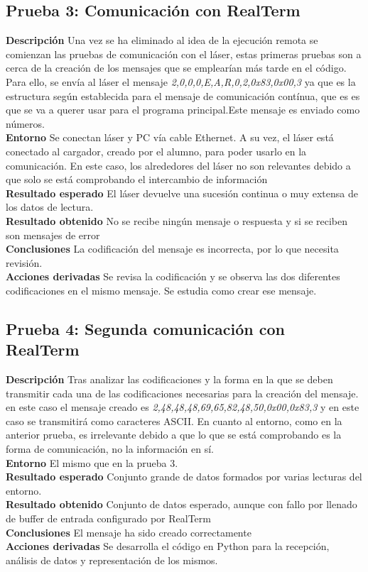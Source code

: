 \subsection{Prueba 3: Comunicación con RealTerm}
\textbf{Descripción} Una vez se ha eliminado al idea de la ejecución remota se comienzan las pruebas de comunicación con el láser, estas primeras pruebas son a cerca de la creación de los mensajes que se emplearían más tarde en el código. Para ello, se envía al láser el mensaje \textit{2,0,0,0,E,A,R,0,2,0x83,0x00,3} ya que es la estructura según establecida para el mensaje de comunicación contínua, que es es que se va a querer usar para el programa principal.Este mensaje es enviado como números.\\
\textbf{Entorno} Se conectan láser y PC vía cable Ethernet. A su vez, el láser está conectado al cargador, creado por el alumno, para poder usarlo en la comunicación. En este caso, los alrededores del láser no son relevantes debido a que solo se está comprobando el intercambio de información\\
\textbf{Resultado esperado} El láser devuelve una sucesión continua o muy extensa de los datos de lectura.\\
\textbf{Resultado obtenido} No se recibe ningún mensaje o respuesta y si se reciben son mensajes de error\\
\textbf{Conclusiones} La codificación del mensaje es incorrecta, por lo que necesita revisión.\\
\textbf{Acciones derivadas}  Se revisa la codificación y se observa las dos diferentes codificaciones en el mismo mensaje. Se estudia como crear ese mensaje.\\

\subsection{Prueba 4: Segunda comunicación con RealTerm}
\textbf{Descripción} Tras analizar las codificaciones y la forma en la que se deben transmitir cada una de las codificaciones necesarias para la creación del mensaje. en este caso el mensaje creado es \textit{2,48,48,48,69,65,82,48,50,0x00,0x83,3} y en este caso se transmitirá como caracteres ASCII. En cuanto al entorno, como en la anterior prueba, es irrelevante debido a que lo que se está comprobando es la forma de comunicación, no la información en sí.\\
\textbf{Entorno} El mismo que en la prueba 3.\\
\textbf{Resultado esperado} Conjunto grande de datos formados por varias lecturas del entorno.\\
\textbf{Resultado obtenido} Conjunto de datos esperado, aunque con fallo por llenado de buffer de entrada configurado por RealTerm\\
\textbf{Conclusiones} El mensaje ha sido creado correctamente\\
\textbf{Acciones derivadas}  Se desarrolla el código en Python para la recepción, análisis de datos y representación de los mismos.

